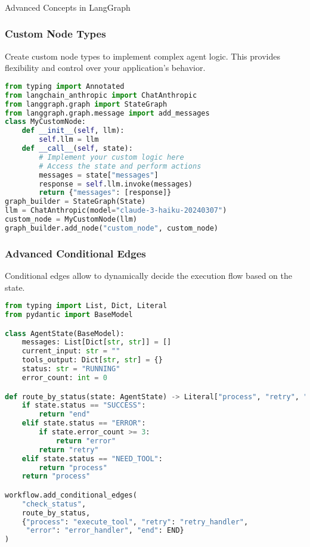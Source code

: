 \begin{frame}[fragile]\frametitle{}
\begin{center}
{\Large Advanced Concepts in LangGraph}
\end{center}
\end{frame}


\begin{frame}[fragile]\frametitle{Custom Node Types}

Create custom node types to implement complex agent logic. This provides flexibility and control over your application's behavior.

      \begin{lstlisting}[language=Python, basicstyle=\tiny]
from typing import Annotated
from langchain_anthropic import ChatAnthropic
from langgraph.graph import StateGraph
from langgraph.graph.message import add_messages
class MyCustomNode:
    def __init__(self, llm):
        self.llm = llm
    def __call__(self, state):
        # Implement your custom logic here
        # Access the state and perform actions
        messages = state["messages"]
        response = self.llm.invoke(messages)
        return {"messages": [response]}
graph_builder = StateGraph(State)
llm = ChatAnthropic(model="claude-3-haiku-20240307")
custom_node = MyCustomNode(llm)
graph_builder.add_node("custom_node", custom_node)
      \end{lstlisting}
\end{frame}



\begin{frame}[fragile]\frametitle{Advanced Conditional Edges}

Conditional edges allow to dynamically decide the execution flow based on the state.

      \begin{lstlisting}[language=Python, basicstyle=\tiny]
from typing import List, Dict, Literal
from pydantic import BaseModel

class AgentState(BaseModel):
    messages: List[Dict[str, str]] = []
    current_input: str = ""
    tools_output: Dict[str, str] = {}
    status: str = "RUNNING"
    error_count: int = 0

def route_by_status(state: AgentState) -> Literal["process", "retry", "error", "end"]:
    if state.status == "SUCCESS":
        return "end"
    elif state.status == "ERROR":
        if state.error_count >= 3:
            return "error"
        return "retry"
    elif state.status == "NEED_TOOL":
        return "process"
    return "process"

workflow.add_conditional_edges(
    "check_status",
    route_by_status,
    {"process": "execute_tool", "retry": "retry_handler", 
     "error": "error_handler", "end": END}
)
      \end{lstlisting}
\end{frame}

